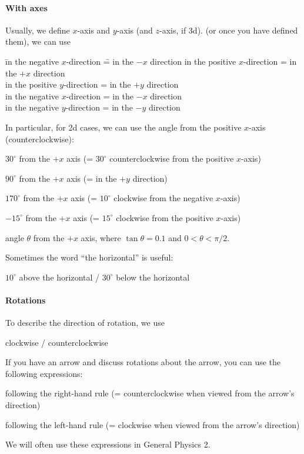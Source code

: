 \documentclass[11pt,pdfa,lastpage]{MishoNote}
\newcommand\fakebullet{\makebox[2.5em][r]{\textbullet\kern.5em}}
\begin{document}
\paragraph{With axes}
Usually, we define $x$-axis and $y$-axis (and $z$-axis, if 3d).  (or once you have defined them), we can use
\begin{tabbing}
  \fakebullet \= in the negative $x$-direction \== in the $-x$ direction\kill
  \fakebullet \> in the positive $x$-direction \>= in the $+x$ direction\\[\itemsep]
  \fakebullet \> in the positive $y$-direction \>= in the $+y$ direction\\[\itemsep]
  \fakebullet \> in the negative $x$-direction \>= in the $-x$ direction\\[\itemsep]
  \fakebullet \> in the negative $y$-direction \>= in the $-y$ direction
 \end{tabbing}
In particular, for 2d cases, we can use the angle from the positive $x$-axis (counterclockwise):
 \begin{miniitemize}
  \item $30^\circ$ from the $+x$ axis (= $30^\circ$ counterclockwise from the positive $x$-axis)
  \item $90^\circ$ from the $+x$ axis (= in the $+y$ direction)
  \item $170^\circ$ from the $+x$ axis (= $10^\circ$ clockwise from the negative $x$-axis)
  \item $-15^\circ$ from the $+x$ axis (= $15^\circ$ clockwise from the positive $x$-axis)
  \item angle $\theta$ from the $+x$ axis, where $\tan\theta=0.1$ and $0<\theta<\pi/2$.
 \end{miniitemize}
Sometimes the word ``the horizontal'' is useful:
\begin{miniitemize}
  \item $10^\circ$ above the horizontal / $30^\circ$ below the horizontal
\end{miniitemize}

\paragraph{Rotations}
To describe the direction of rotation, we use
\begin{miniitemize}
  \item clockwise / counterclockwise
\end{miniitemize}
If you have an arrow and discuss rotations about the arrow, you can use the following expressions:
\begin{miniitemize}
  \item following the right-hand rule (= counterclockwise when viewed from the arrow's direction)
  \item following the left-hand rule (= clockwise when viewed from the arrow's direction)
\end{miniitemize}
We will often use these expressions in General Physics 2.
\end{document}
